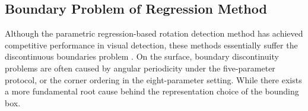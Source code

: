 \documentclass[10pt,journal,compsoc]{IEEEtran}
\begin{document}
\subsection{Boundary Problem of Regression Method}\label{sec:bp}
Although the parametric regression-based rotation detection method has achieved competitive performance in visual detection, these methods essentially suffer the discontinuous boundaries problem \cite{yang2019scrdet,qian2021learning}. On the surface, boundary discontinuity problems are often caused by angular periodicity under the five-parameter protocol, or the corner ordering in the eight-parameter setting. While there exists a more fundamental root cause behind the representation choice of the bounding box.

\begin{figure*}[!tb]
	\centering
	\\
	\vspace{-8pt}
\end{figure*}
\end{document}
